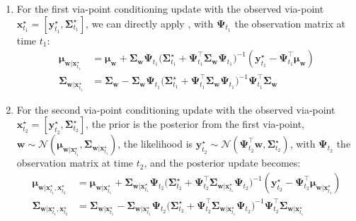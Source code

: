 \documentclass{article}
\begin{document}
\begin{enumerate}
\item For the first via-point conditioning update with the observed via-point $\bm{x}_{t_{1}}^\star = [\bm{y}_{t_{1}}^\star, \bm{\Sigma}^\star_{t_{1}}]$, we can directly apply , with $\bm{\Psi}_{t_1}$ the observation matrix at time $t_{1}$:
\begin{align}
\bm{\mu}_{\bm{w}|\bm{x}_{t_{1}}^\star} &= \bm{\mu_w} + \bm{\Sigma_w}\bm{\Psi}_{t_1} \Big(\bm{\Sigma}_{t_{1}}^\star + \bm{\Psi}_{t_1}^\top \bm{\Sigma_w}\bm{\Psi}_{t_1} \Big)^{-1} (\bm{y}_{t_{1}}^\star - \bm{\Psi}_{t_1}^\top \bm{\mu_w})\\
\bm{\Sigma}_{\bm{w}|\bm{x}_{t_{1}}^\star} &= \bm{\Sigma_w} - \bm{\Sigma_w}\bm{\Psi}_{t_1} \Big(\bm{\Sigma}_{t_{1}}^\star +  \bm{\Psi}_{t_1}^\top \bm{\Sigma_w}\bm{\Psi}_{t_1} \Big)^{-1} \bm{\Psi}_{t_1}^\top \bm{\Sigma_w}
\end{align}

\item For the second via-point conditioning update with the observed via-point $\bm{x}_{t_{2}}^\star = [\bm{y}_{t_{2}}^\star, \bm{\Sigma}^\star_{t_{2}}]$, the prior is the posterior from the first via-point, \ie{} $\bm{w} \sim \mathcal{N}(\bm{\mu}_{\bm{w}|\bm{x}_{t_{1}}^\star}, \bm{\Sigma}_{\bm{w}|\bm{x}_{t_{1}}^\star})$, the likelihood is $\bm{y}_{t_{2}}^\star \sim \mathcal{N}(\bm{\Psi}_{t_2}^\top \bm{w}, \bm{\Sigma}_{t_{2}}^\star)$, with $\bm{\Psi}_{t_2}$ the observation matrix at time $t_{2}$, and the posterior update becomes:
\begin{align}
\bm{\mu}_{\bm{w}|\bm{x}_{t_{1}}^{\star}, \bm{x}_{t_{2}}^\star} &= \bm{\mu}_{\bm{w}|\bm{x}_{t_{1}}^\star} + \bm{\Sigma}_{\bm{w}|\bm{x}_{t_{1}}^\star}\bm{\Psi}_{t_2} \Big(\bm{\Sigma}_{t_{2}}^\star + \bm{\Psi}_{t_2}^\top \bm{\Sigma}_{\bm{w}|\bm{x}_{t_{1}}^\star}\bm{\Psi}_{t_2} \Big)^{-1} (\bm{y}_{t_{2}}^\star - \bm{\Psi}_{t_2}^\top \bm{\mu}_{\bm{w}|\bm{x}_{t_{1}}^\star})\\
\bm{\Sigma}_{\bm{w}|\bm{x}_{t_{1}}^{\star}, \bm{x}_{t_{2}}^\star} &= \bm{\Sigma}_{\bm{w}|\bm{x}_{t_{1}}^\star} - \bm{\Sigma}_{\bm{w}|\bm{x}_{t_{1}}^\star}\bm{\Psi}_{t_2} \Big(\bm{\Sigma}_{t_{2}}^\star +  \bm{\Psi}_{t_2}^\top \bm{\Sigma}_{\bm{w}|\bm{x}_{t_{1}}^\star}\bm{\Psi}_{t_2} \Big)^{-1} \bm{\Psi}_{t_2}^\top \bm{\Sigma}_{\bm{w}|\bm{x}_{t_{1}}^\star}
\end{align}


\end{enumerate}
\end{document}
